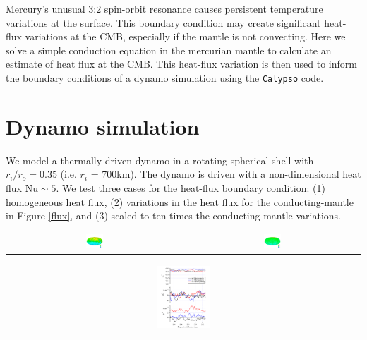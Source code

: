 \documentclass[landscape,a0b,final]{a0poster}
\begin{document}
\begin{multicols}{3}
Mercury's unusual 3:2 spin-orbit resonance causes persistent temperature variations at the surface.  This boundary condition may create significant heat-flux variations at the CMB, especially if the mantle is not convecting.  Here we solve a simple conduction equation in the mercurian mantle to calculate an estimate of heat flux at the CMB.  This heat-flux variation is then used to inform the boundary conditions of a dynamo simulation using the \texttt{Calypso} code.

\columnbreak

\section*{Dynamo simulation}

We model a thermally driven dynamo in a rotating spherical shell with $r_{i}/r_{o} =
0.35$ (i.e.  $r_i$ = 700km).  The dynamo is driven with a non-dimensional heat flux
$\mathrm{Nu} \sim 5$.  We test three cases for the heat-flux boundary condition: (1)
homogeneous heat flux, (2) variations in the heat flux for the conducting-mantle in
Figure \ref{flux}, and (3) scaled to ten times the conducting-mantle variations.
\begin{center}
\begin{tabular}{cc}
 \includegraphics[width=0.1\textwidth]{br_cmb_x0.png} &
 \includegraphics[width=0.1\textwidth]{br_cmb_x10.png}
\end{tabular}
\label{dynamo}
\end{center}

\begin{center}
\begin{tabular}{c}
 \includegraphics[width=0.15\textwidth]{gauss_coefficients.pdf} 
\end{tabular}
\label{gauss}
\end{center}



\end{multicols}
\end{document}
